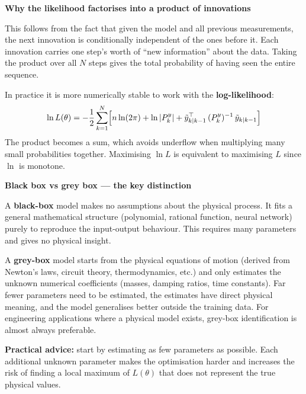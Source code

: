 \documentclass[12pt, a4paper]{article}
\begin{document}
\begin{notebox}
  \textbf{Why the likelihood factorises into a product of innovations}

  This follows from the fact that given the model and all previous
  measurements, the next innovation is conditionally independent of
  the ones before it.
  Each innovation carries one step's worth of ``new information'' about
  the data.
  Taking the product over all $N$ steps gives the total probability of
  having seen the entire sequence.

  In practice it is more numerically stable to work with the
  \textbf{log-likelihood}:
  \[
    \ln L(\theta)
    = -\frac{1}{2}\sum_{k=1}^{N}
      \Bigl[
        n\ln(2\pi)
        + \ln|P_k^y|
        + \tilde{y}_{k|k-1}^\top\,(P_k^y)^{-1}\,\tilde{y}_{k|k-1}
      \Bigr]
  \]
  The product becomes a sum, which avoids underflow when multiplying
  many small probabilities together.
  Maximising $\ln L$ is equivalent to maximising $L$ since $\ln$ is
  monotone.
\end{notebox}

\begin{notebox}
  \textbf{Black box vs grey box --- the key distinction}

  A \textbf{black-box} model makes no assumptions about the physical
  process.
  It fits a general mathematical structure (polynomial, rational
  function, neural network) purely to reproduce the input-output
  behaviour.
  This requires many parameters and gives no physical insight.

  A \textbf{grey-box} model starts from the physical equations of motion
  (derived from Newton's laws, circuit theory, thermodynamics, etc.) and
  only estimates the unknown numerical coefficients (masses, damping
  ratios, time constants).
  Far fewer parameters need to be estimated, the estimates have direct
  physical meaning, and the model generalises better outside the
  training data.
  For engineering applications where a physical model exists, grey-box
  identification is almost always preferable.

  \textbf{Practical advice:} start by estimating as few parameters as
  possible.
  Each additional unknown parameter makes the optimisation harder and
  increases the risk of finding a local maximum of $L(\theta)$ that
  does not represent the true physical values.
\end{notebox}
\end{document}
